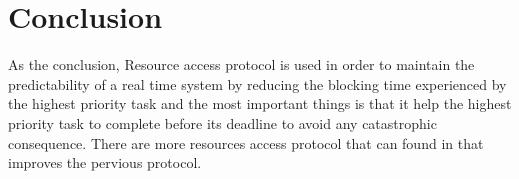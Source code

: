 \section{Conclusion}

As the conclusion, Resource access protocol is used in order to maintain the predictability of a real time system by reducing the blocking time experienced by the highest priority task and the most important things is that it help the highest priority task to complete before its deadline to avoid any catastrophic consequence. There are more resources access protocol that can found in \cite{b5} that improves the pervious protocol.
